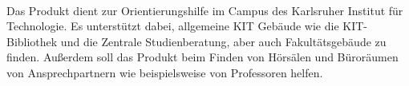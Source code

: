 \paragraph*{}
Das Produkt dient zur Orientierungshilfe im Campus des Karlsruher Institut für Technologie.
Es unterstützt dabei, allgemeine KIT Gebäude wie die KIT-Bibliothek und die Zentrale Studienberatung, aber auch Fakultätsgebäude zu finden. Außerdem soll das Produkt beim Finden von Hörsälen und Büroräumen von Ansprechpartnern wie beispielsweise von Professoren helfen.